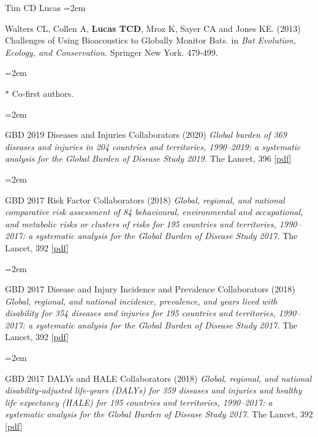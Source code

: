 \documentclass{scrartcl}
\newcommand{\MarginText}[1]{\marginpar{\raggedleft\itshape\small#1}} %
\newcommand{\Description}[1]{\hangindent=2em\hangafter=0\noindent\raggedright\footnotesize{#1}\par\normalsize\vspace{1em}} %
\begin{document}
\begin{cv}{Tim {\Large CD} Lucas}
\Description{\MarginText{2013}Walters CL, Collen A, \textbf{Lucas TCD}, Mroz K, Sayer CA and Jones KE. (2013) Challenges of Using Bioacoustics to Globally Monitor Bats. in \emph{Bat Evolution, Ecology, and Conservation.} Springer New York. 479-499.}

\Description{\MarginText{} \scriptsize{ $\ast$ Co-first authors. } }



{\color{Maroon}}\vspace{1em}


\Description{\MarginText{2020}GBD 2019 Diseases and Injuries Collaborators (2020) \emph{Global burden of 369 diseases and injuries in 204 countries and territories, 1990–2019: a systematic analysis for the Global Burden of Disease Study 2019.} The Lancet, 396 [\href{https://reader.elsevier.com/reader/sd/pii/S0140673618322256?token=B51BB41EDB592105E398079BFEE0CA91BB2DA80DC879A7B3CFD538DFBF8ADE6FA424858694B94E7860E6AE8461E553E7}{pdf}]}


\Description{\MarginText{2018}GBD 2017 Risk Factor Collaborators (2018) \emph{Global, regional, and national comparative risk assessment of 84 behavioural, environmental and occupational, and metabolic risks or clusters of risks for 195 countries and territories, 1990--2017: a systematic analysis for the Global Burden of Disease Study 2017.} The Lancet, 392 [\href{https://reader.elsevier.com/reader/sd/pii/S0140673618322256?token=B51BB41EDB592105E398079BFEE0CA91BB2DA80DC879A7B3CFD538DFBF8ADE6FA424858694B94E7860E6AE8461E553E7}{pdf}]}

\Description{GBD 2017 Disease and Injury Incidence and Prevalence Collaborators (2018) \emph{Global, regional, and national incidence, prevalence, and years lived with disability for 354 diseases and injuries for 195 countries and territories, 1990--2017: a systematic analysis for the Global Burden of Disease Study 2017.} The Lancet, 392 [\href{https://www.sciencedirect.com/science/article/pii/S0140673618322797/pdfft?md5=7f77aa9068dc470c4dec82747c586883&pid=1-s2.0-S0140673618322797-main.pdf}{pdf}]}


\Description{GBD 2017 DALYs and HALE Collaborators (2018) \emph{Global, regional, and national disability-adjusted life-years (DALYs) for 359 diseases and injuries and healthy life expectancy (HALE) for 195 countries and territories, 1990--2017: a systematic analysis for the Global Burden of Disease Study 2017.} The Lancet, 392 [\href{https://www.sciencedirect.com/science/article/pii/S0140673618318919/pdfft?md5=e63230d66805f99e38a7dc60873c7bf0&pid=1-s2.0-S0140673618318919-main.pdf}{pdf}]}


\end{cv}
\end{document}

